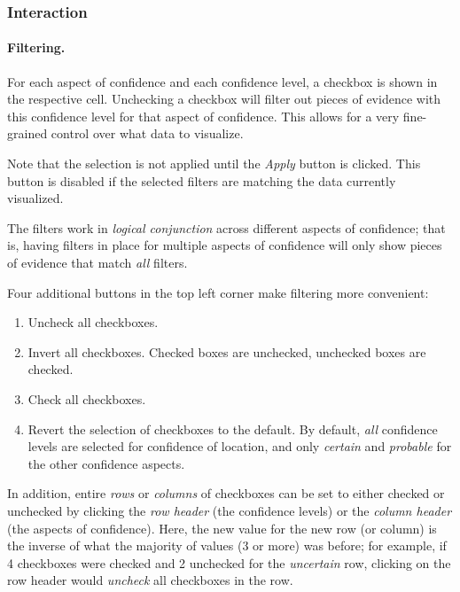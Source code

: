 \subsubsection{Interaction}

\paragraph{Filtering.}
\label{sec:confidence-filtering}
For each aspect of confidence and each confidence level, a checkbox is shown in the respective cell.
Unchecking a checkbox will filter out pieces of evidence with this confidence level for that aspect of confidence.
This allows for a very fine-grained control over what data to visualize.

Note that the selection is not applied until the \emph{Apply} button is clicked.
This button is disabled if the selected filters are matching the data currently visualized.

The filters work in \emph{logical conjunction} across different aspects of confidence;
that is, having filters in place for multiple aspects of confidence will only show pieces of evidence that match \emph{all} filters.

Four additional buttons in the top left corner make filtering more convenient:

\begin{enumerate}
  \item Uncheck all checkboxes.
  \item
    Invert all checkboxes.
    Checked boxes are unchecked, unchecked boxes are checked.
  \item Check all checkboxes.
  \item
    Revert the selection of checkboxes to the default.
    By default, \emph{all} confidence levels are selected for confidence of location, and only \emph{certain} and \emph{probable} for the other confidence aspects.
\end{enumerate}

In addition, entire \emph{rows} or \emph{columns} of checkboxes can be set to either checked or unchecked by clicking the \emph{row header} (the confidence levels) or the \emph{column header} (the aspects of confidence).
Here, the new value for the new row (or column) is the inverse of what the majority of values (3 or more) was before;
for example, if 4 checkboxes were checked and 2 unchecked for the \emph{uncertain} row, clicking on the row header would \emph{uncheck} all checkboxes in the row.

